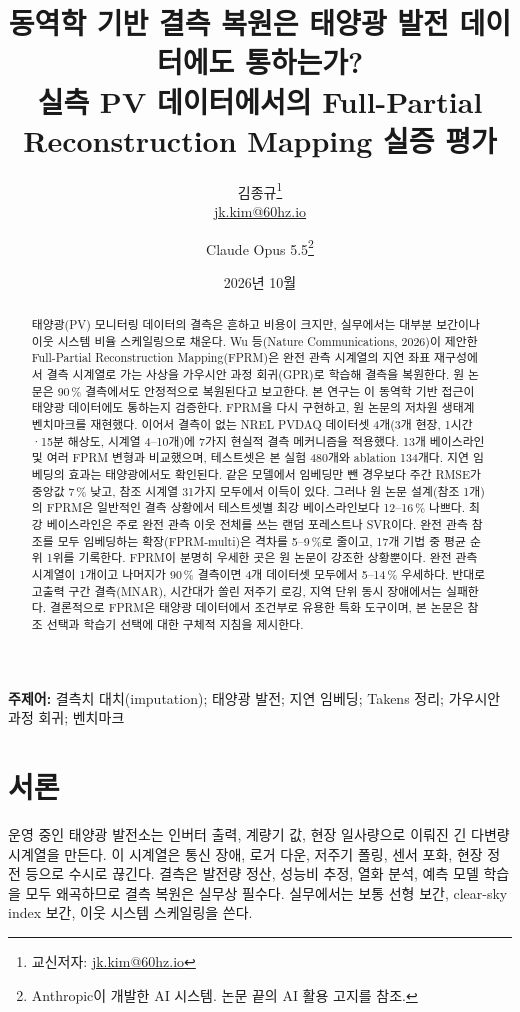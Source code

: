 \documentclass[11pt,a4paper]{article}
\title{\textbf{동역학 기반 결측 복원은 태양광 발전 데이터에도 통하는가?}\\[4pt]
\large 실측 PV 데이터에서의 Full-Partial Reconstruction Mapping 실증 평가}
\author{김종규\thanks{교신저자: \href{mailto:jk.kim@60hz.io}{jk.kim@60hz.io}}\\\small\href{mailto:jk.kim@60hz.io}{jk.kim@60hz.io}
\and Claude Opus 5.5\thanks{Anthropic이 개발한 AI 시스템. 논문 끝의 AI 활용 고지를 참조.}}
\date{2026년 10월}
\newcommand{\pct}{\,\%}
\begin{document}
\renewcommand{\tablename}{표}\renewcommand{\figurename}{그림}\renewcommand{\abstractname}{초록}\renewcommand{\refname}{참고 문헌}
\maketitle

\begin{abstract}
태양광(PV) 모니터링 데이터의 결측은 흔하고 비용이 크지만, 실무에서는 대부분 보간이나 이웃 시스템 비율 스케일링으로 채운다.
Wu 등(Nature Communications, 2026)이 제안한 Full-Partial Reconstruction Mapping(FPRM)은 완전 관측 시계열의 지연 좌표 재구성에서 결측 시계열로 가는 사상을 가우시안 과정 회귀(GPR)로 학습해 결측을 복원한다. 원 논문은 90\pct{} 결측에서도 안정적으로 복원된다고 보고한다.
본 연구는 이 동역학 기반 접근이 태양광 데이터에도 통하는지 검증한다.
FPRM을 다시 구현하고, 원 논문의 저차원 생태계 벤치마크를 재현했다.
이어서 결측이 없는 NREL PVDAQ 데이터셋 4개(3개 현장, 1시간·15분 해상도, 시계열 4--10개)에 7가지 현실적 결측 메커니즘을 적용했다. 13개 베이스라인 및 여러 FPRM 변형과 비교했으며, 테스트셋은 본 실험 480개와 ablation 134개다.
지연 임베딩의 효과는 태양광에서도 확인된다. 같은 모델에서 임베딩만 뺀 경우보다 주간 RMSE가 중앙값 7\pct{} 낮고, 참조 시계열 31가지 모두에서 이득이 있다.
그러나 원 논문 설계(참조 1개)의 FPRM은 일반적인 결측 상황에서 테스트셋별 최강 베이스라인보다 12--16\pct{} 나쁘다. 최강 베이스라인은 주로 완전 관측 이웃 전체를 쓰는 랜덤 포레스트나 SVR이다.
완전 관측 참조를 모두 임베딩하는 확장(FPRM-multi)은 격차를 5--9\pct{}로 줄이고, 17개 기법 중 평균 순위 1위를 기록한다.
FPRM이 분명히 우세한 곳은 원 논문이 강조한 상황뿐이다. 완전 관측 시계열이 1개이고 나머지가 90\pct{} 결측이면 4개 데이터셋 모두에서 5--14\pct{} 우세하다.
반대로 고출력 구간 결측(MNAR), 시간대가 쏠린 저주기 로깅, 지역 단위 동시 장애에서는 실패한다.
결론적으로 FPRM은 태양광 데이터에서 조건부로 유용한 특화 도구이며, 본 논문은 참조 선택과 학습기 선택에 대한 구체적 지침을 제시한다.
\end{abstract}

\noindent\textbf{주제어:} 결측치 대치(imputation); 태양광 발전; 지연 임베딩; Takens 정리; 가우시안 과정 회귀; 벤치마크

\section{서론}\label{sec:intro}

운영 중인 태양광 발전소는 인버터 출력, 계량기 값, 현장 일사량으로 이뤄진 긴 다변량 시계열을 만든다.
이 시계열은 통신 장애, 로거 다운, 저주기 폴링, 센서 포화, 현장 정전 등으로 수시로 끊긴다.
결측은 발전량 정산, 성능비 추정, 열화 분석, 예측 모델 학습을 모두 왜곡하므로 결측 복원은 실무상 필수다.
실무에서는 보통 선형 보간, clear-sky index 보간, 이웃 시스템 스케일링을 쓴다.
\end{document}
